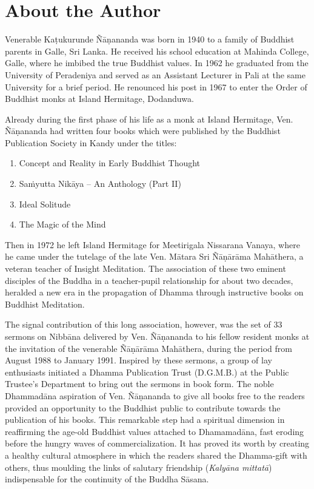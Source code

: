 \chapter{About the Author}

Venerable Kaṭukurunde Ñāṇananda was born in 1940 to a family of Buddhist parents in Galle, Sri Lanka. He received his school education at Mahinda College, Galle, where he imbibed the true Buddhist values. In 1962 he graduated from the University of Peradeniya and served as an Assistant Lecturer in Pali at the same University for a brief period. He renounced his post in 1967 to enter the Order of Buddhist monks at Island Hermitage, Dodanduwa.

Already during the first phase of his life as a monk at Island Hermitage, Ven. Ñāṇananda had written four books which were published by the Buddhist Publication Society in Kandy under the titles:

\begin{enumerate}
\item Concept and Reality in Early Buddhist Thought
\item Saṁyutta Nikāya -- An Anthology (Part II)
\item Ideal Solitude
\item The Magic of the Mind
\end{enumerate}

Then in 1972 he left Island Hermitage for Meetirigala Nissarana Vanaya, where he came under the tutelage of the late Ven. Mātara Sri Ñāṇārāma Mahāthera, a veteran teacher of Insight Meditation. The association of these two eminent disciples of the Buddha in a teacher-pupil relationship for about two decades, heralded a new era in the propagation of Dhamma through instructive books on Buddhist Meditation.

The signal contribution of this long association, however, was the set of 33 sermons on Nibbāna delivered by Ven. Ñāṇananda to his fellow resident monks at the invitation of the venerable Ñāṇārāma Mahāthera, during the period from August 1988 to January 1991. Inspired by these sermons, a group of lay enthusiasts initiated a Dhamma Publication Trust (D.G.M.B.) at the Public Trustee's Department to bring out the sermons in book form. The noble Dhammadāna aspiration of Ven. Ñāṇananda to give all books free to the readers provided an opportunity to the Buddhist public to contribute towards the publication of his books. This remarkable step had a spiritual dimension in reaffirming the age-old Buddhist values attached to Dhamamadāna, fast eroding before the hungry waves of commercialization. It has proved its worth by creating a healthy cultural atmosphere in which the readers shared the Dhamma-gift with others, thus moulding the links of salutary friendship (\emph{Kalyāna mittatā}) indispensable for the continuity of the Buddha Sāsana.

